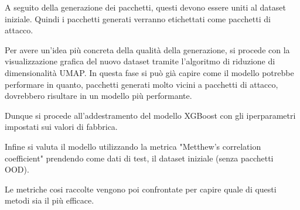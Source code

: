 A seguito della generazione dei pacchetti, questi devono essere uniti al dataset iniziale. Quindi i pacchetti generati verranno etichettati come pacchetti di attacco.

Per avere un'idea più concreta della qualità della generazione, si procede con la visualizzazione grafica del nuovo dataset tramite l'algoritmo di riduzione di dimensionalità UMAP. In questa fase si può già capire come il modello potrebbe performare in quanto, pacchetti generati molto vicini a pacchetti di attacco, dovrebbero risultare in un modello più performante.

Dunque si procede all'addestramento del modello XGBoost con gli iperparametri impostati sui valori di fabbrica.

Infine si valuta il modello utilizzando la metrica "Metthew's correlation coefficient" prendendo come dati di test, il dataset iniziale (senza pacchetti OOD).

Le metriche cosi raccolte vengono poi confrontate per capire quale di questi metodi sia il più efficace.



%
%
%
%
%
%
%
